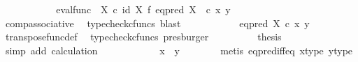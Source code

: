 \begin{isabellebody}
\ \ \ \ \ \ \isamarkupfalse%
\ \isamarkupfalse%
\ {\isachardoublequoteopen}{\isachardot}{\kern0pt}{\isachardot}{\kern0pt}{\isachardot}{\kern0pt}\ {\isacharequal}{\kern0pt}\ {\isacharparenleft}{\kern0pt}{\isacharparenleft}{\kern0pt}eval{\isacharunderscore}{\kern0pt}func\ {\isasymOmega}\ X{\isacharparenright}{\kern0pt}\ {\isasymcirc}\isactrlsub c\ {\isacharparenleft}{\kern0pt}id\ X\ {\isasymtimes}\isactrlsub f\ {\isacharparenleft}{\kern0pt}eq{\isacharunderscore}{\kern0pt}pred\ X\isactrlsup {\isasymsharp}{\isacharparenright}{\kern0pt}{\isacharparenright}{\kern0pt}\ {\isacharparenright}{\kern0pt}\ {\isasymcirc}\isactrlsub c\ {\isasymlangle}x{\isacharcomma}{\kern0pt}\ y{\isasymrangle}{\isachardoublequoteclose}\isanewline
\ \ \ \ \ \ \ \ \isamarkupfalse%
\ comp{\isacharunderscore}{\kern0pt}associative{}\ \isamarkupfalse%
\ {\isacharparenleft}{\kern0pt}typecheck{\isacharunderscore}{\kern0pt}cfuncs{\isacharcomma}{\kern0pt}\ blast{\isacharparenright}{\kern0pt}\isanewline
\ \ \ \ \ \ \isamarkupfalse%
\ \isamarkupfalse%
\ {\isachardoublequoteopen}{\isachardot}{\kern0pt}{\isachardot}{\kern0pt}{\isachardot}{\kern0pt}\ {\isacharequal}{\kern0pt}\ eq{\isacharunderscore}{\kern0pt}pred\ X\ {\isasymcirc}\isactrlsub c\ {\isasymlangle}x{\isacharcomma}{\kern0pt}\ y{\isasymrangle}{\isachardoublequoteclose}\isanewline
\ \ \ \ \ \ \ \ \isamarkupfalse%
\ transpose{\isacharunderscore}{\kern0pt}func{\isacharunderscore}{\kern0pt}def\ \isamarkupfalse%
\ {\isacharparenleft}{\kern0pt}typecheck{\isacharunderscore}{\kern0pt}cfuncs{\isacharcomma}{\kern0pt}\ presburger{\isacharparenright}{\kern0pt}\isanewline
\ \ \ \ \ \ \isamarkupfalse%
\ \isamarkupfalse%
\ {\isacharquery}{\kern0pt}thesis\isanewline
\ \ \ \ \ \ \ \ \isamarkupfalse%
\ {\isacharparenleft}{\kern0pt}simp\ add{\isacharcolon}{\kern0pt}\ calculation{\isacharparenright}{\kern0pt}\isanewline
\ \ \ \ \isamarkupfalse%
\isanewline
\ \ \ \ \isamarkupfalse%
\ \isamarkupfalse%
\ {\isachardoublequoteopen}x\ {\isacharequal}{\kern0pt}\ y{\isachardoublequoteclose}\isanewline
\ \ \ \ \ \ \isamarkupfalse%
\ {\isacharparenleft}{\kern0pt}metis\ eq{\isacharunderscore}{\kern0pt}pred{\isacharunderscore}{\kern0pt}iff{\isacharunderscore}{\kern0pt}eq\ x{\isacharunderscore}{\kern0pt}type\ y{\isacharunderscore}{\kern0pt}type{\isacharparenright}{\kern0pt}\isanewline
\ \ \isamarkupfalse%

\end{isabellebody}
